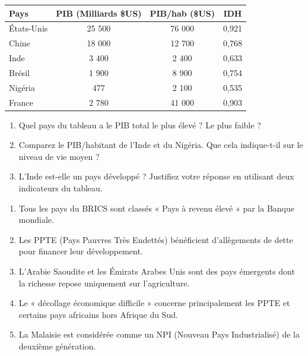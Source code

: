 \documentclass[11pt]{article}
\begin{document}
\begin{exercice}
\begin{center}
\begin{tabular}{|l|c|c|c|}
\hline
\textbf{Pays} & \textbf{PIB (Milliards \$US)} & \textbf{PIB/hab (\$US)} & \textbf{IDH} \\
\hline
États-Unis & 25 500 & 76 000 & 0,921 \\
Chine & 18 000 & 12 700 & 0,768 \\
Inde & 3 400 & 2 400 & 0,633 \\
Brésil & 1 900 & 8 900 & 0,754 \\
Nigéria & 477 & 2 100 & 0,535 \\
France & 2 780 & 41 000 & 0,903 \\
\hline
\end{tabular}
\end{center}
\begin{enumerate}
    \item Quel pays du tableau a le PIB total le plus élevé ? Le plus faible ?
    \item Comparez le PIB/habitant de l'Inde et du Nigéria. Que cela indique-t-il sur le niveau de vie moyen ?
    \item L'Inde est-elle un pays développé ? Justifiez votre réponse en utilisant deux indicateurs du tableau.
\end{enumerate}
\end{exercice}

\begin{exercice}
\begin{enumerate}
    \item Tous les pays du BRICS sont classés « Pays à revenu élevé » par la Banque mondiale.
    \item Les PPTE (Pays Pauvres Très Endettés) bénéficient d'allègements de dette pour financer leur développement.
    \item L'Arabie Saoudite et les Émirats Arabes Unis sont des pays émergents dont la richesse repose uniquement sur l'agriculture.
    \item Le « décollage économique difficile » concerne principalement les PPTE et certains pays africains hors Afrique du Sud.
    \item La Malaisie est considérée comme un NPI (Nouveau Pays Industrialisé) de la deuxième génération.
\end{enumerate}
\end{exercice}
\end{document}
